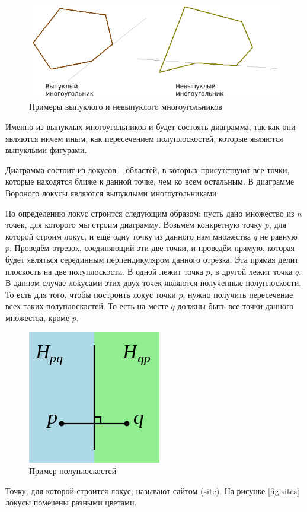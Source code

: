 \begin{figure}[h]
	\centering\includegraphics[width=0.7\linewidth]{img/mnogoug}
	\caption{Примеры выпуклого и невыпуклого многоугольников}
	\label{fig:mnogoug}
\end{figure}

Именно из выпуклых многоугольников и будет состоять диаграмма, так как они являются ничем иным, как пересечением полуплоскостей, которые являются выпуклыми фигурами.

Диаграмма состоит из локусов -- областей, в которых присутствуют все точки, которые находятся ближе к данной точке, чем ко всем остальным. В диаграмме Вороного локусы являются выпуклыми многоугольниками.

По определению локус строится следующим образом: пусть дано множество из $n$ точек, для которого мы строим диаграмму. Возьмём конкретную точку $p$, для которой строим локус, и ещё одну точку из данного нам множества $q$ не равную $p$. Проведём отрезок, соединяющий эти две точки, и проведём прямую, которая будет являться серединным перпендикуляром данного отрезка. Эта прямая делит плоскость на две полуплоскости. В одной лежит точка $p$, в другой лежит точка $q$. В данном случае локусами этих двух точек являются полученные полуплоскости. То есть для того, чтобы построить локус точки $p$, нужно получить пересечение всех таких полуплоскостей. То есть на месте $q$ должны быть все точки данного множества, кроме $p$.

\begin{figure}[h]
	\centering\includegraphics[width=0.3\linewidth]{img/polupl}
	\caption{Пример полуплоскостей}
	\label{fig:polupl}
\end{figure}

Точку, для которой строится локус, называют сайтом (site). На рисунке \ref{fig:sites} локусы помечены разными цветами.


